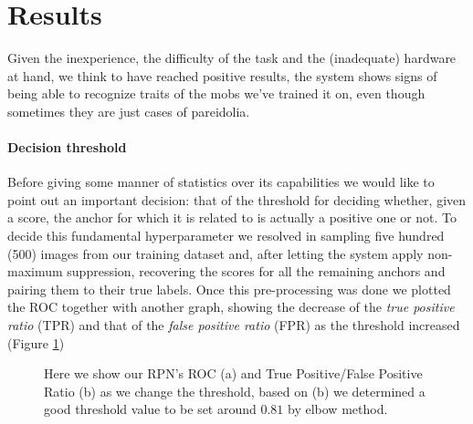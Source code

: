\documentclass[10pt,journal,cspaper,compsoc]{IEEEtran}
\begin{document}
    \section{Results}
    Given the inexperience, the difficulty of the task and the (inadequate) hardware at hand, we think to have reached positive results, the system shows signs of being able to recognize traits of the mobs we've trained it on, even though sometimes they are just cases of pareidolia.
    \paragraph*{Decision threshold} Before giving some manner of statistics over its capabilities we would like to point out an important decision: that of the threshold for deciding whether, given a score, the anchor for which it is related to is actually a positive one or not. To decide this fundamental hyperparameter we resolved in sampling five hundred (500) images from our training dataset and, after letting the system apply non-maximum suppression, recovering the scores for all the remaining anchors and pairing them to their true labels. Once this pre-processing was done we plotted the ROC together with another graph, showing the decrease of the \emph{true positive ratio} (TPR) and that of the \emph{false positive ratio} (FPR) as the threshold increased (Figure \ref{fig:ROCs})

    \begin{figure}[tb]
        \centering
         \hfill
        \caption{Here we show our RPN's ROC (a) and True Positive/False Positive Ratio (b) as we change the threshold, based on (b) we determined a good threshold value to be set around $0.81$ by elbow method.}
        \label{fig:ROCs}
    \end{figure}
\end{document}
